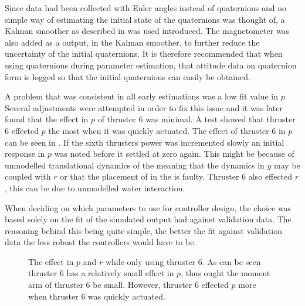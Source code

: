 Since data had been collected with Euler angles instead of quaternions and no simple way of estimating the initial state of the quaternions was thought of, a Kalman smoother as described in \citet{Wallin} was used introduced. The magnetometer was also added as a output, in the Kalman smoother, to further reduce the uncertainty of the initial quaternions. It is therefore recommended that when using quaternions during parameter estimation, that attitude data on quaternion form is logged so that the initial quaternions can easily be obtained. 

A problem that was consistent in all early estimations was a low fit value in $p$. Several adjustments were attempted in order to fix this issue and it was later found that the effect in $p$ of thruster 6 was minimal. A test showed that thruster 6 effected $p$ the most when it was quickly actuated. The effect of thruster 6 in $p$ can be seen in . If the sixth thrusters power was incremented slowly an initial response in $p$ was noted before it settled at zero again. This might be because of unmodelled translational dynamics of the \abbrROV meaning that the dynamics in $y$ may be coupled with $r$ or that the placement of \abbrCG in the \abbrROV is faulty. Thruster 6 also effected $r$, this can be due to unmodelled water interaction.

When deciding on which parameters to use for controller design, the choice was based solely on the fit of the simulated output had against validation data. The reasoning behind this being quite simple, the better the fit against validation data the less robust the controllers would have to be.


\begin{figure}
\centering
  \qquad
  \qquad
  \caption{\label{fig:thruster6}%
  The effect in $p$ and $r$ while only using thruster 6. As can be seen thruster 6 has a relatively small effect in $p$, thus ought the moment arm of thruster 6 be small. However, thruster 6 effected $p$ more when thruster 6 was quickly actuated.}
\end{figure}

